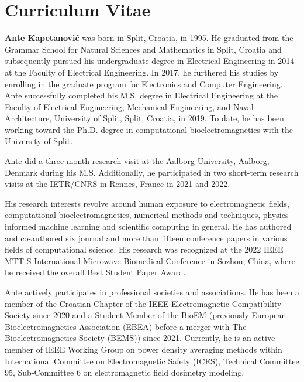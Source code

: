 \cleardoublepage
\pagestyle{empty}

\section*{Curriculum Vitae}
\vspace{15mm}
\noindent \textbf{Ante Kapetanović} was born in Split, Croatia, in 1995.
He graduated from the Grammar School for Natural Sciences and Mathematics in Split, Croatia and subsequently pursued his undergraduate degree in Electrical Engineering in 2014 at the Faculty of Electrical Engineering.
In 2017, he furthered his studies by enrolling in the graduate program for Electronics and Computer Engineering.
Ante successfully completed his M.S. degree in Electrical Engineering at the Faculty of Electrical Engineering, Mechanical Engineering, and Naval Architecture, University of Split, Split, Croatia, in 2019.
To date, he has been working toward the Ph.D. degree in computational bioelectromagnetics with the University of Split.

Ante did a three-month research visit at the Aalborg University, Aalborg, Denmark during his M.S.
Additionally, he participated in two short-term research visits at the IETR/CNRS in Rennes, France in 2021 and 2022.

His research interests revolve around human exposure to electromagnetic fields, computational bioelectromagnetics, numerical methods and techniques, physics-informed machine learning and scientific computing in general.
He has authored and co-authored six journal and more than fifteen conference papers in various fields of computational science.
His research was recognized at the 2022 IEEE MTT-S International Microwave Biomedical Conference in Sozhou, China, where he received the overall Best Student Paper Award.

Ante actively participates in professional societies and associations.
He has been a member of the Croatian Chapter of the IEEE Electromagnetic Compatibility Society since 2020 and a Student Member of the BioEM (previously European Bioelectromagnetics Association (EBEA) before a merger with The Bioelectromagnetics Society (BEMS)) since 2021.
Currently, he is an active member of IEEE Working Group on power density averaging methods within International Committee on Electromagnetic Safety (ICES), Technical Committee 95, Sub-Committee 6 on electromagnetic field dosimetry modeling.

\cleardoublepage
\pagestyle{empty}
